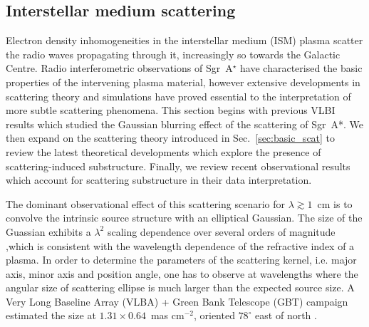 \subsection{Interstellar medium scattering}\label{sec:ism_scat}

Electron density inhomogeneities in the interstellar medium (ISM) plasma scatter the radio waves propagating through it, increasingly so towards the Galactic Centre. Radio interferometric observations of Sgr~A$^\star$ have characterised the basic properties of the intervening plasma material, however extensive developments in scattering theory and simulations have proved essential to the interpretation of more subtle scattering phenomena. This section begins with previous VLBI results which studied the Gaussian blurring effect of the scattering of Sgr~A*. We then expand on the scattering theory introduced in Sec.~\ref{sec:basic_scat} to review the latest theoretical developments which explore the presence of scattering-induced substructure. Finally, we review recent observational results which account for scattering substructure in their data interpretation. 


The dominant observational effect of this scattering scenario for $\lambda \gtrsim 1$~cm is to convolve the intrinsic source structure with an elliptical Gaussian. The size of the Guassian exhibits a $\lambda^2$ scaling dependence over several orders of magnitude \citep[Fig.~\ref{fig:scattering_law}][]{Backer_1978, Shen_2005, Bower_2006, Lu_2011},which is consistent with the wavelength dependence of the refractive index of a plasma. In order to determine the parameters of the scattering kernel, i.e. major axis, minor axis and position angle,  one has to observe at wavelengths where the angular size of scattering ellipse is much larger than the expected source size. A Very Long Baseline Array (VLBA) + Green Bank Telescope (GBT) campaign  estimated the size at $1.31 \times 0.64$~mas cm$^{-2}$, oriented $78^\circ$ east of north \citep{Bower_2006}. 


